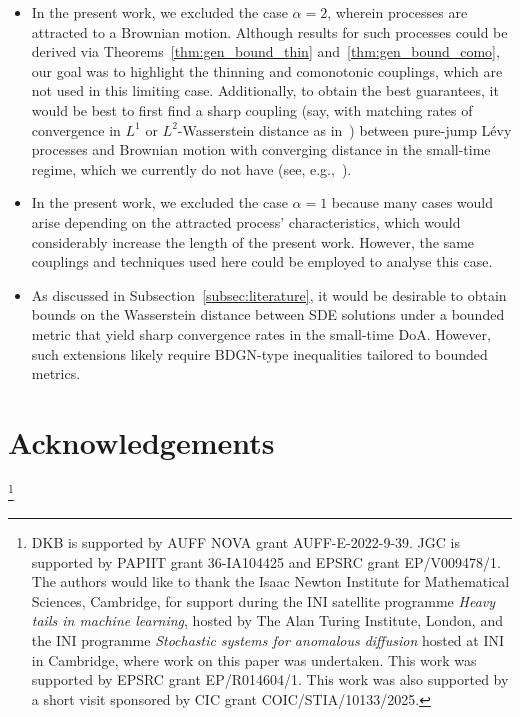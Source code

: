 \documentclass[en,oneside,bbfont,article]{amsart}
\theoremstyle{remark}
\theoremstyle{definition}
\theoremstyle{definition}
\newcommand\1{\mathds{1}}
\begin{document}
\begin{itemize}
\item In the present work, we excluded the case $\alpha=2$, wherein processes are attracted to a Brownian motion. Although results for such processes could be derived via Theorems~\ref{thm:gen_bound_thin} and~\ref{thm:gen_bound_como}, our goal was to highlight the thinning and comonotonic couplings, which are not used in this limiting case. Additionally, to obtain the best guarantees, it would be best to first find a sharp coupling (say, with matching rates of convergence in $L^1$ or $L^2$-Wasserstein distance as in~\cite{WassersteinPaper}) between pure-jump L\'evy processes and Brownian motion with converging distance in the small-time regime, which we currently do not have (see, e.g.,~\cite[Sec.~2.4]{WassersteinPaper}). 
\item In the present work, we excluded the case $\alpha=1$ because many cases would arise depending on the attracted process' characteristics, which would considerably increase the length of the present work. However, the same couplings and techniques used here could be employed to analyse this case.
\item As discussed in Subsection~\ref{subsec:literature}, it would be desirable to obtain bounds on the Wasserstein distance between SDE solutions under a bounded metric that yield sharp convergence rates in the small-time DoA. However, such extensions likely require BDGN-type inequalities tailored to bounded metrics.
\end{itemize}


%
%
\printbibliography


\section*{Acknowledgements}
\thanks{
\noindent DKB is supported by AUFF NOVA grant AUFF-E-2022-9-39. JGC is supported by PAPIIT grant 36-IA104425 and EPSRC grant EP/V009478/1. The authors would like to thank the Isaac Newton Institute for Mathematical Sciences, Cambridge, for support during the INI satellite programme \textit{Heavy tails in machine learning}, hosted by The Alan Turing Institute, London, and the INI programme \textit{Stochastic systems for anomalous diffusion} hosted at INI in Cambridge, where work on this paper was undertaken. This work was supported by EPSRC grant EP/R014604/1. This work was also supported by a short visit sponsored by CIC grant COIC/STIA/10133/2025.}
\end{document}
